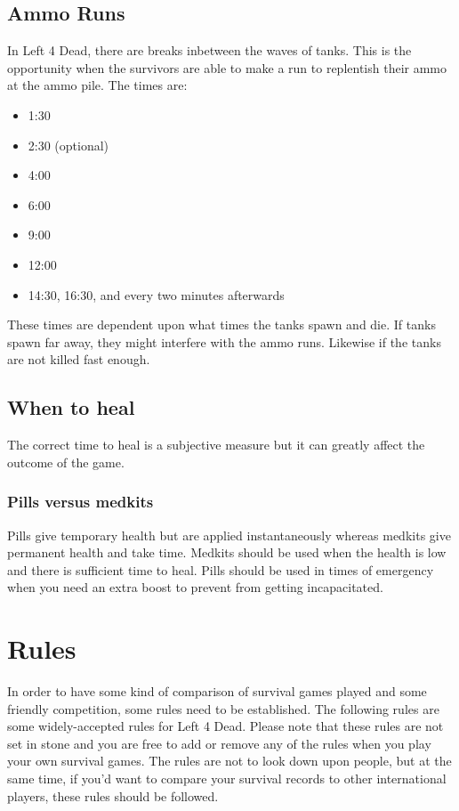 \subsection{Ammo Runs}
In Left 4 Dead, there are breaks inbetween the waves of tanks. This is the opportunity when the survivors are able to make a run to replentish their ammo at the ammo pile. The times are:
\begin{itemize}
\item 1:30
\item 2:30 (optional)
\item 4:00
\item 6:00
\item 9:00
\item 12:00
\item 14:30, 16:30, and every two minutes afterwards
\end{itemize}

These times are dependent upon what times the tanks spawn and die. If tanks spawn far away, they might interfere with the ammo runs. Likewise if the tanks are not killed fast enough.

\subsection{When to heal}
The correct time to heal is a subjective measure but it can greatly affect the outcome of the game.

\subsubsection{Pills versus medkits}
Pills give temporary health but are applied instantaneously whereas medkits give permanent health and take time. Medkits should be used when the health is low and there is sufficient time to heal. Pills should be used in times of emergency when you need an extra boost to prevent from getting incapacitated.

\section{Rules} \label{sec:rules1}
In order to have some kind of comparison of survival games played and some friendly competition, some rules need to be established. The following rules are some widely-accepted rules for Left 4 Dead. Please note that these rules are not set in stone and you are free to add or remove any of the rules when you play your own survival games. The rules are not to look down upon people, but at the same time, if you'd want to compare your survival records to other international players, these rules should be followed.

